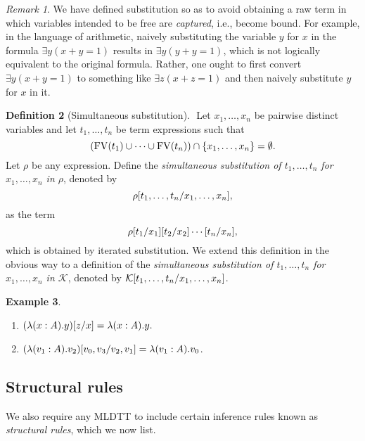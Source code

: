 \documentclass[10pt,letterpaper,cm]{nupset}
\theoremstyle{definition}
\newtheorem{definition}{Definition}[subsection]
\newtheorem{exmp}[definition]{Example}
\theoremstyle{theorem}
\theoremstyle{remark}
\newtheorem{remark}[definition]{Remark}
\newcommand{\K}{\mathcal K}
\newcommand{\0}{\mathbf{0}}
\newcommand{\1}{\mathbf{1}}
\newcommand{\2}{\mathbf{2}}
\DeclareMathOperator{\fv}{FV}
\newcommand{\be}{\begin{enumerate}}
\newcommand{\ee}{\end{enumerate}}
\begin{document}
\begin{remark}
We have defined substitution so as to avoid obtaining a raw term in which variables intended to be free are \textit{captured}, i.e., become bound. 
For example, in the language of arithmetic, naively substituting the variable $y$ for $x$ in the formula $\exists y(x+y=1) $ results in $\exists y(y+y=1)$, which is not logically equivalent to the original formula. Rather, one ought to first convert $\exists y(x+y=1) $ to something like $\exists z(x+z=1)$ and then naively substitute $y$ for $x$ in it.
\end{remark}

\begin{definition}[Simultaneous substitution]\label{ssub} $ $
Let $x_1, \ldots, x_n$ be pairwise distinct variables and let $t_1, \ldots, t_n$ be term expressions such that $$\mleft(\fv(t_1) \cup \cdots \cup \fv(t_n)\mright) \cap \mleft\{x_1, \ldots, x_n\mright\} =\emptyset.$$ Let $\rho$ be any expression. Define the \textit{simultaneous substitution of   $t_1, \ldots, t_n$ for $x_1, \ldots, x_n$ in $\rho$}, denoted by $$ \rho\mleft[t_1, \ldots, t_n / x_1, \ldots, x_n\mright]   ,$$  as the term  $$ \rho\mleft[t_1/x_1\mright]\mleft[t_2/x_2\mright]\cdots \mleft[t_n/x_n\mright]     ,$$ which is obtained by iterated substitution. We extend this definition in the obvious way to a definition of the \textit{simultaneous substitution of $t_1, \ldots, t_n$ for $x_1, \ldots, x_n$  in $\K$}, denoted   by $\K\mleft[t_1, \ldots, t_n / x_1, \ldots, x_n\mright]$.
\end{definition}

\begin{exmp} $ $
\be
\item $\mleft(\lambda (x:A).y\mright)[z/x] =\lambda (x:A).y.$
\item $\mleft(\lambda (v_1:A).v_2\mright)\mleft[v_0, v_3/ v_2, v_1\mright] = \lambda(v_1:A).v_0$. 
\ee
\end{exmp}

\subsection{Structural rules} 
We also require any  MLDTT to include certain inference rules known as \textit{structural rules}, which we now list.

\smallskip
\end{document}
